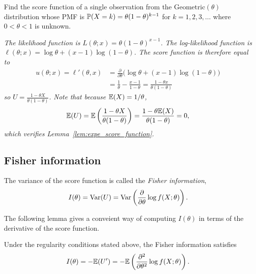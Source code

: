 \begin{example}\label{ex:score_geometric}
Find the score function of a single observation from the $\text{Geometric}(\theta)$ distribution whose PMF is $\mathbb{P}(X=k)=\theta(1-\theta)^{k-1}$ for $k=1,2,3,\ldots$ where $0<\theta<1$ is unknown. 
\begin{solution}
\bit
\it The likelihood function is $L(\theta;x) = \theta(1-\theta)^{x-1}$.
\it The log-likelihood function is $\ell(\theta;x) = \log\theta + (x-1)\log(1-\theta)$.
\eit
The score function is therefore equal to
\begin{align*}
u(\theta;x) = \ell'(\theta,x)
	& = \frac{\partial}{\partial\theta} \big(\log\theta + (x-1)\log(1-\theta)\big) \\
	& = \frac{1}{\theta} - \frac{x-1}{1-\theta}
	= \frac{1-\theta x}{\theta(1-\theta)}
\end{align*}
so $U = \displaystyle\frac{1-\theta X}{\theta(1-\theta)}$. Note that because $\mathbb{E}(X)=1/\theta$,
\[
\mathbb{E}(U)
	= \mathbb{E}\left(\frac{1-\theta X}{\theta(1-\theta)}\right)
	= \frac{1-\theta\mathbb{E}(X)}{\theta(1-\theta)}
	= 0,
\]
which verifies Lemma~\ref{lem:expe_score_function}.
\end{solution}
\end{example}

\subsection{Fisher information}
\begin{definition}
The variance of the score function is called the \emph{Fisher information}, 
\[
I(\theta) = \text{Var}(U) = \text{Var}\left(\frac{\partial}{\partial\theta}\log f(X;\theta)\right).
\]
\end{definition}

The following lemma gives a conveient way of computing $I(\theta)$ in terms of the derivative of the score function.
\begin{lemma}\label{lem:fisher}
Under the regularity conditions stated above, the Fisher information satisfies
\[
I(\theta) = -\mathbb{E}(U')= -\mathbb{E}\left(\frac{\partial^2}{\partial\theta^2}\log f(X;\theta)\right).
\]
\end{lemma}

